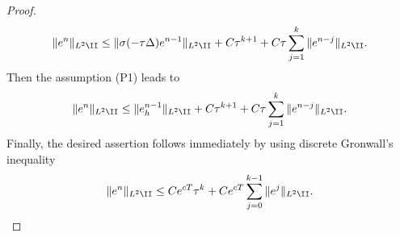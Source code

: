 \begin{proof}
\begin{align*}
\|  e ^n \|_{L^2\II} \le \|  \sigma(-\tau \Delta)e ^{n-1} \|_{L^2\II}  +  C \tau^{k+1}  + C \tau \sum_{j=1}^k \|  e^{n-j}  \|_{L^2\II}.
\end{align*}
Then the assumption (P1) leads to
\begin{align*}
\|  e ^n \|_{L^2\II} \le \|  e_h^{n-1} \|_{L^2\II}  +  C \tau^{k+1}  + C \tau \sum_{j=1}^k \|  e^{n-j}  \|_{L^2\II}.
\end{align*}
Finally, the desired assertion follows immediately by using discrete Gronwall's inequality
\begin{align*}
\|  e ^n \|_{L^2\II}  \le  C e^{cT} \tau^{k}  + C e^{cT}  \sum_{j=0}^{k-1} \|  e^{j}  \|_{L^2\II}.
\end{align*}
\end{proof}


